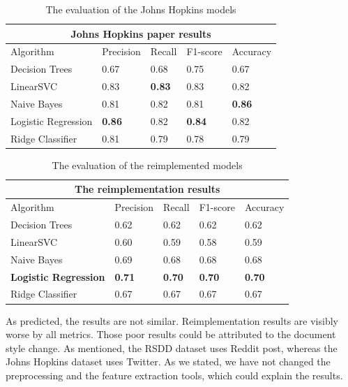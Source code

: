 \documentclass[times, utf8, seminar]{fer}
\begin{document}
\begin{table}[h!]
	\centering
	\begin{tabular}{|p{4cm}|p{2cm}|p{2cm}|p{2cm}|p{2cm}|} 
		\hline
		\multicolumn{5}{|c|}{Johns Hopkins paper results}\\
		\hline
		Algorithm & Precision & Recall & F1-score & Accuracy \\ [0.5ex] 
		\hline
		Decision Trees & 0.67 & 0.68 & 0.75 & 0.67 \\ 
		LinearSVC & 0.83 & \textbf{0.83} & 0.83 & 0.82 \\ 
		Naive Bayes & 0.81 & 0.82 & 0.81 & \textbf{0.86} \\ 
		Logistic Regression &  \textbf{0.86} & 0.82 &  \textbf{0.84} & 0.82 \\ 
		Ridge Classifier & 0.81 & 0.79 & 0.78 & 0.79 \\ 
		\hline
	\end{tabular}
	\caption{The evaluation of the Johns Hopkins models}
	\label{Table:1}
\end{table}

\newpage

\begin{table}[h!]
	\centering
	\begin{tabular}{|p{4cm}|p{2cm}|p{2cm}|p{2cm}|p{2cm}|} 
		\hline
		\multicolumn{5}{|c|}{The reimplementation results}\\
		\hline
		Algorithm & Precision & Recall & F1-score & Accuracy \\ [0.5ex] 
		\hline
		Decision Trees & 0.62 & 0.62 & 0.62 & 0.62 \\ 
		LinearSVC & 0.60 & 0.59 & 0.58 & 0.59 \\ 
		Naive Bayes & 0.69 & 0.68 & 0.68 & 0.68 \\ 
		\textbf{Logistic Regression} &  \textbf{0.71} & \textbf{0.70} &  \textbf{0.70} & \textbf{0.70} \\ 
		Ridge Classifier & 0.67 & 0.67 & 0.67 & 0.67 \\ 
		\hline
	\end{tabular}
	\caption{The evaluation of the reimplemented models}
	\label{Table:1}
\end{table}

As predicted, the results are not similar. Reimplementation results are visibly worse by all metrics. Those poor results could be attributed to the document style change. As mentioned, the RSDD dataset uses Reddit post, whereas the Johns Hopkins dataset uses Twitter. As we stated, we have not changed the preprocessing and the feature extraction tools, which could explain the results. 
\end{document}
